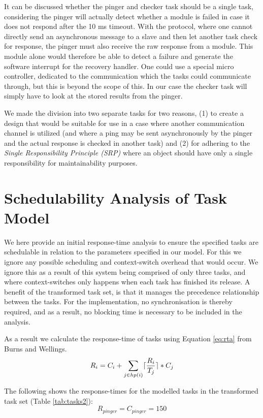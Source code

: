 It can be discussed whether the pinger and checker task should be a single task, considering the pinger will actually detect whether a module is failed in case it does not respond after the 10 ms timeout. With the \iic protocol, where one cannot directly send an asynchronous message to a slave and then let another task check for response, the pinger must also receive the raw response from a module. This module alone would therefore be able to detect a failure and generate the software interrupt for the recovery handler. One could use a special \iic micro controller, dedicated to the communication which the tasks could communicate through, but this is beyond the scope of this. In our case the checker task will simply have to look at the stored results from the pinger.

We made the division into two separate tasks for two reasons, (1) to create a design that would be suitable for use in a case where another communication channel is utilized (and where a ping may be sent asynchronously by the pinger and the actual response is checked in another task) and (2) for adhering to the \textit{Single Responsibility Principle (SRP)} where an object should have only a single responsibility for maintainability purposes.

\section{Schedulability Analysis of Task Model}
We here provide an initial response-time analysis to ensure the specified tasks are schedulable in relation to the parameters specified in our model. For this we ignore any possible scheduling and context-switch overhead that would occur. We ignore this as a result of this system being comprised of only three tasks, and where context-switches only happens when each task has finished its release. A benefit of the transformed task set, is that it manages the precedence relationship between the tasks. For the implementation, no synchronisation is thereby required, and as a result, no blocking time is necessary to be included in the analysis.

As a result we calculate the response-time of tasks using Equation \ref{eq:rta} from Burns and Wellings.
\begin{equation}
\label{eq:rta}
     R_{i} = C_{i} + \sum\limits_{j\in hp(i)} \lceil\frac{R_{i}}{T_{j}}\rceil*C_{j}
\end{equation}

The following shows the response-times for the modelled tasks in the transformed task set (Table \ref{tab:tasks2}):
\begin{equation}
\label{eq:pingerrta1}
     R_{pinger} = C_{pinger} = 150 
\end{equation}

